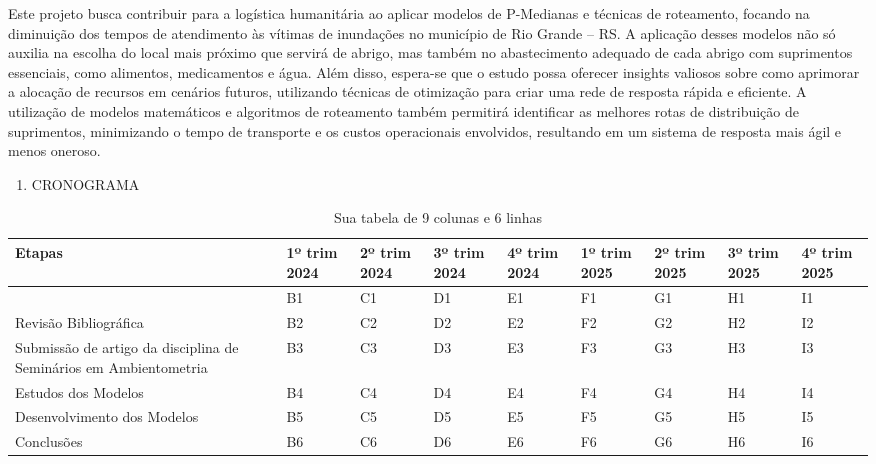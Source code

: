 \documentclass[
]{article}
\providecommand{\tightlist}{%
  \setlength{\itemsep}{0pt}\setlength{\parskip}{0pt}}
\begin{document}
Este projeto busca contribuir para a logística humanitária ao aplicar
modelos de P-Medianas e técnicas de roteamento, focando na diminuição
dos tempos de atendimento às vítimas de inundações no município de Rio
Grande -- RS. A aplicação desses modelos não só auxilia na escolha do
local mais próximo que servirá de abrigo, mas também no abastecimento
adequado de cada abrigo com suprimentos essenciais, como alimentos,
medicamentos e água. Além disso, espera-se que o estudo possa oferecer
insights valiosos sobre como aprimorar a alocação de recursos em
cenários futuros, utilizando técnicas de otimização para criar uma rede
de resposta rápida e eficiente. A utilização de modelos matemáticos e
algoritmos de roteamento também permitirá identificar as melhores rotas
de distribuição de suprimentos, minimizando o tempo de transporte e os
custos operacionais envolvidos, resultando em um sistema de resposta
mais ágil e menos oneroso.

\begin{enumerate}
\def\labelenumi{\arabic{enumi}.}
\setcounter{enumi}{5}
\tightlist
\item
  CRONOGRAMA
\end{enumerate}

\begin{table}[ht]
\centering
\begin{tabular}{|p{3cm}|p{1.5cm}|p{1.5cm}|p{1.5cm}|p{1.5cm}|p{1.5cm}|p{1.5cm}|p{1.5cm}|p{1.5cm}|}
\hline
Etapas & 1º trim 2024 & 2º trim 2024 & 3º trim 2024 & 4º trim 2024 & 1º trim 2025 & 2º trim 2025 & 3º trim 2025 & 4º trim 2025 \\ \hline
   & B1   & C1   & D1   & E1   & F1   & G1   & H1   & I1   \\ \hline
Revisão Bibliográfica   & B2   & C2   & D2   & E2   & F2   & G2   & H2   & I2   \\ \hline
Submissão de artigo da
disciplina de Seminários
em Ambientometria& B3   & C3   & D3   & E3   & F3   & G3   & H3   & I3   \\ \hline
Estudos dos Modelos   & B4   & C4   & D4   & E4   & F4   & G4   & H4   & I4   \\ \hline
Desenvolvimento dos
Modelos& B5   & C5   & D5   & E5   & F5   & G5   & H5   & I5   \\ \hline
Conclusões   & B6   & C6   & D6   & E6   & F6   & G6   & H6   & I6   \\ \hline
\end{tabular}
\caption{Sua tabela de 9 colunas e 6 linhas}
\end{table}
\end{document}
